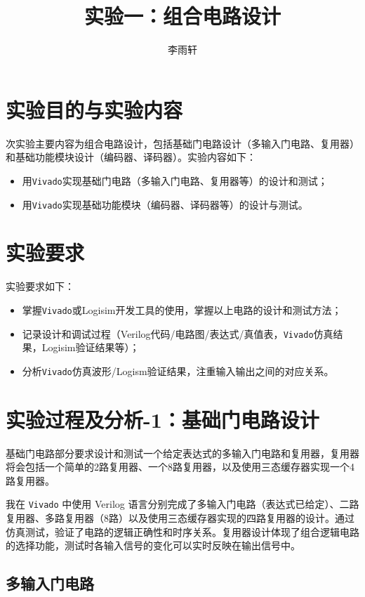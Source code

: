 \documentclass[10pt,a4paper,twoside]{rho-class/rho}
\title{实验一：组合电路设计}
\author {李雨轩}
\affil {西安交通大学}
\affil {计算机2205班}
\affil {2204112913}
\begin{document}
	
    \maketitle
    \thispagestyle{firststyle}

\section{实验目的与实验内容}
    次实验主要内容为组合电路设计，包括基础门电路设计（多输入门电路、复用器）和基础功能模块设计（编码器、译码器）。实验内容如下：
    \begin {itemize}
        \item 用\verb|Vivado|实现基础门电路（多输入门电路、复用器等）的设计和测试；
        \item 用\verb|Vivado|实现基础功能模块（编码器、译码器等）的设计与测试。
    \end {itemize}

\section{实验要求}
    实验要求如下：
    \begin{itemize}
        \item 掌握\verb|Vivado|或Logisim开发工具的使用，掌握以上电路的设计和测试方法；
        \item 记录设计和调试过程（Verilog代码/电路图/表达式/真值表，\verb|Vivado|仿真结果，Logisim验证结果等）；
        \item 分析\verb|Vivado|仿真波形/Logism验证结果，注重输入输出之间的对应关系。
    \end{itemize}

\section{实验过程及分析-1：基础门电路设计}
    基础门电路部分要求设计和测试一个给定表达式的多输入门电路和复用器，复用器将会包括一个简单的2路复用器、一个8路复用器，以及使用三态缓存器实现一个4路复用器。
    
    我在 \verb|Vivado| 中使用 Verilog 语言分别完成了多输入门电路（表达式已给定）、二路复用器、多路复用器（8路）以及使用三态缓存器实现的四路复用器的设计。通过仿真测试，验证了电路的逻辑正确性和时序关系。复用器设计体现了组合逻辑电路的选择功能，测试时各输入信号的变化可以实时反映在输出信号中。

    \subsection{多输入门电路}
\end{document}

